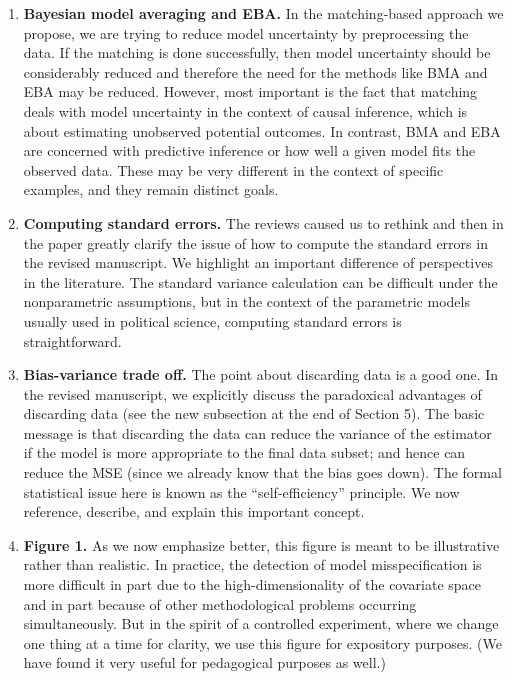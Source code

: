 \documentclass[11pt]{article}
\begin{document}
\begin{enumerate}
\item {\bf Bayesian model averaging and EBA.} In the matching-based
  approach we propose, we are trying to reduce model uncertainty by
  preprocessing the data.  If the matching is done successfully, then
  model uncertainty should be considerably reduced and therefore the
  need for the methods like BMA and EBA may be reduced.  However, most
  important is the fact that matching deals with model uncertainty in
  the context of causal inference, which is about estimating
  unobserved potential outcomes.  In contrast, BMA and EBA are
  concerned with predictive inference or how well a given model fits
  the observed data.  These may be very different in the context of
  specific examples, and they remain distinct goals.
  
\item {\bf Computing standard errors.}  The reviews caused us to
  rethink and then in the paper greatly clarify the issue of how to
  compute the standard errors in the revised manuscript.  We highlight
  an important difference of perspectives in the literature.  The
  standard variance calculation can be difficult under the
  nonparametric assumptions, but in the context of the parametric
  models usually used in political science, computing standard errors
  is straightforward.
  
\item {\bf Bias-variance trade off.} The point about discarding data
  is a good one.  In the revised manuscript, we explicitly discuss the
  paradoxical advantages of discarding data (see the new subsection at
  the end of Section 5). The basic message is that discarding the data
  can reduce the variance of the estimator if the model is more
  appropriate to the final data subset; and hence can reduce the MSE
  (since we already know that the bias goes down).  The formal
  statistical issue here is known as the ``self-efficiency''
  principle.  We now reference, describe, and explain this important
  concept.
  
\item {\bf Figure 1.} As we now emphasize better, this figure is meant
  to be illustrative rather than realistic. In practice, the detection
  of model misspecification is more difficult in part due to the
  high-dimensionality of the covariate space and in part because of
  other methodological problems occurring simultaneously.  But in the
  spirit of a controlled experiment, where we change one thing at a
  time for clarity, we use this figure for expository purposes.  (We
  have found it very useful for pedagogical purposes as well.)
  

\end{enumerate}
\end{document}

